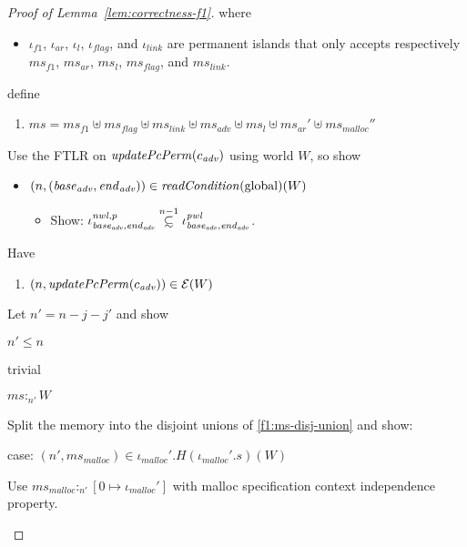 \documentclass[a4paper]{article}
\newcommand\subsetsim{\mathrel{\ooalign{\raise.2ex\hbox{$\subset$}\cr
      \hidewidth\lower.8ex\hbox{\scalebox{0.9}{$\sim$}}\hidewidth\cr}}}
\newcommand{\nsubsim}[1][n]{\stackrel{\tiny{#1}}{\subsetsim}}
\newcommand{\var}[1]{\mathit{#1}}
\newcommand{\hs}{\var{ms}}
\newcommand{\ms}{\hs}
\newcommand{\start}{\var{base}}
\newcommand{\addrend}{\var{end}}
\newcommand{\heap}{\var{mem}}
\newcommand{\adv}{\var{adv}}
\newcommand{\link}{\var{link}}
\newcommand{\flag}{\var{flag}}
\newcommand{\nwl}{\var{nwl}}
\newcommand{\pwl}{\var{pwl}}
\newcommand{\plainfun}[2]{
  \ifthenelse{\equal{#2}{}}
  {\mathit{#1}}
  {\mathit{#1}(#2)}
}
\newcommand{\updatePcPerm}[1]{\plainfun{updatePcPerm}{#1}}
\newcommand{\readCond}[1]{\plainfun{readCondition}{#1}}
\newcommand{\heapSat}[3][\heap]{#1 :_{#2} #3}
\newcommand{\codelabel}[1]{\mathit{#1}}
\newcommand{\malloc}{\codelabel{malloc}}
\newcommand{\asmType}{\plaindom{AsmType}}
\newcommand{\plaindom}[1]{\mathrm{#1}}
\newcommand{\intr}[2]{\mathcal{#1}}
\newcommand{\exprintr}[1]{\intr{E}{#1}}
\newcommand{\stder}{\exprintr{\asmType}}
\newcommand{\npair}[2][n]{\left(#1,#2 \right)}
\newcommand{\plainperm}[1]{\mathrm{#1}}
\newcommand{\glob}{\plainperm{global}}
\begin{document}
\begin{proof}[Proof of Lemma~\ref{lem:correctness-f1}]
  where
  \begin{itemize}
  \item $\iota_{f1}$, $\iota_{\var{ar}}$, $\iota_l$, $\iota_\flag$, and $\iota_\link$ are permanent islands that only accepts respectively $\ms_{f1}$, $\ms_{\var{ar}}$, $\ms_l$, $\ms_\flag$, and $\ms_\link$.
  \end{itemize}
  define
  \begin{enumerate}
  \item $\ms = \hs_{f1} \uplus 
    \hs_\flag \uplus                
    \ms_{\var{link}} \uplus 
    \hs_\adv \uplus 
    \ms_{l} \uplus
    \ms_{\var{ar}}' \uplus
    \ms_{\malloc}'' $ \label{f1:ms-disj-union}
  \end{enumerate}
  Use the FTLR on $\updatePcPerm{c_{\var{adv}}}$ using world $W$, so show
  \begin{itemize}
  \item $\npair{(\start_{\adv},\addrend_{\adv})} \in \readCond{}(\glob)(W)$
    \begin{itemize}
    \item Show: $\iota^{\nwl,p}_{\start_\adv,\addrend_\adv} \nsubsim[n-1] \iota^\pwl_{\start_\adv,\addrend_\adv}$.
    \end{itemize}
  \end{itemize}
  Have
  \begin{enumerate}[resume]
  \item $\npair{\updatePcPerm{c_{\var{adv}}}} \in \stder(W)$
  \end{enumerate}
  Let $n' = n - j - j'$ and show
  \begin{enumproof}[resume]
  \item $n' \leq n$
    \begin{enumproof}
    \item trivial
    \end{enumproof}
  \item $\heapSat[\ms]{n'}{W}$
    \begin{enumproof}
    \item Split the memory into the disjoint unions of \ref{f1:ms-disj-union} and show:
      \begin{enumproof}
      \item case: $\npair[n']{\ms_\malloc} \in \iota_\malloc'.H (\iota_\malloc'.s) (W)$ 
        \begin{enumproof}
        \item Use $\heapSat[\ms_\malloc]{n'}{[0 \mapsto \iota_\malloc']}$ with malloc specification context independence property.
        \end{enumproof}

\end{enumproof}
\end{enumproof}
\end{enumproof}
\end{proof}
\end{document}
